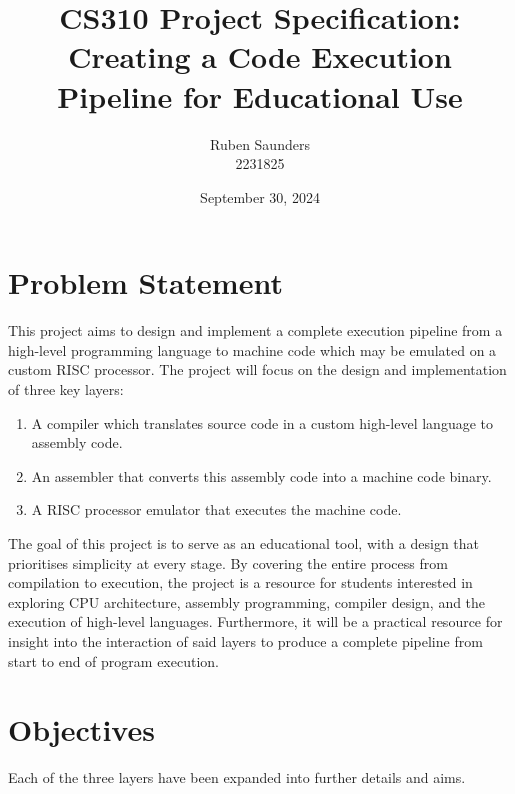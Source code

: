 \documentclass{article}
\begin{document}
    \title{CS310 Project Specification:\\Creating a Code Execution Pipeline for Educational Use}
    \author{Ruben Saunders\\2231825}
    \date{September 30, 2024}

    \maketitle

    \section{Problem Statement}\label{sec:problem-statement}

    This project aims to design and implement a complete execution pipeline from a high-level programming language to machine code which may be emulated on a custom RISC processor.
    The project will focus on the design and implementation of three key layers:

    \begin{enumerate}
        \item A compiler which translates source code in a custom high-level language to assembly code.
        \item An assembler that converts this assembly code into a machine code binary.
        \item A RISC processor emulator that executes the machine code.
    \end{enumerate}

    The goal of this project is to serve as an educational tool, with a design that prioritises simplicity at every stage.
    By covering the entire process from compilation to execution, the project is a resource for students interested in exploring CPU architecture, assembly programming, compiler design, and the execution of high-level languages.
    Furthermore, it will be a practical resource for insight into the interaction of said layers to produce a complete pipeline from start to end of program execution.

    \section{Objectives}\label{sec:objectives}

    Each of the three layers have been expanded into further details and aims.
\end{document}
